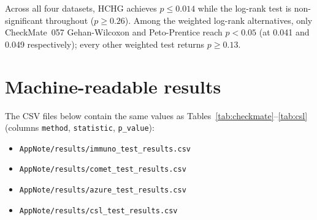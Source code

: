 \documentclass[11pt]{article}
\begin{document}
\noindent
Across all four datasets, HCHG achieves $p \leq 0.014$ while the log-rank
test is non-significant throughout ($p \geq 0.26$). Among the weighted
log-rank alternatives, only CheckMate~057 Gehan-Wilcoxon and Peto-Prentice
reach $p < 0.05$ (at 0.041 and 0.049 respectively); every other weighted
test returns $p \geq 0.13$.

\section{Machine-readable results}

The CSV files below contain the same values as Tables~\ref{tab:checkmate}--\ref{tab:csl}
(columns \texttt{method}, \texttt{statistic}, \texttt{p\_value}):

\begin{itemize}
  \item \texttt{AppNote/results/immuno\_test\_results.csv}
  \item \texttt{AppNote/results/comet\_test\_results.csv}
  \item \texttt{AppNote/results/azure\_test\_results.csv}
  \item \texttt{AppNote/results/csl\_test\_results.csv}
\end{itemize}



\end{document}
